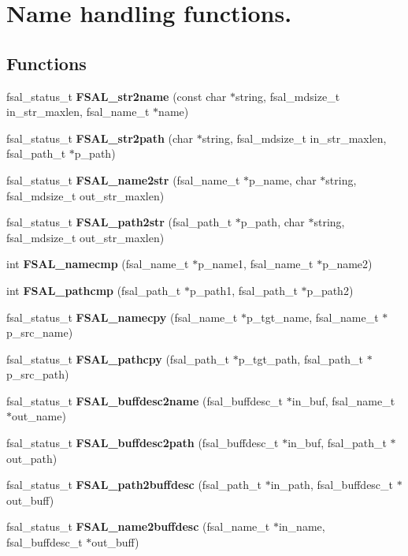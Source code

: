 \section{Name handling functions.}
\label{group__FSALNameFunctions}
\subsection*{Functions}
\begin{CompactItemize}
\item 
fsal\_\-status\_\-t {\bf FSAL\_\-str2name} (const char $\ast$string, fsal\_\-mdsize\_\-t in\_\-str\_\-maxlen, fsal\_\-name\_\-t $\ast$name)
\item 
fsal\_\-status\_\-t {\bf FSAL\_\-str2path} (char $\ast$string, fsal\_\-mdsize\_\-t in\_\-str\_\-maxlen, fsal\_\-path\_\-t $\ast$p\_\-path)
\item 
fsal\_\-status\_\-t {\bf FSAL\_\-name2str} (fsal\_\-name\_\-t $\ast$p\_\-name, char $\ast$string, fsal\_\-mdsize\_\-t out\_\-str\_\-maxlen)
\item 
fsal\_\-status\_\-t {\bf FSAL\_\-path2str} (fsal\_\-path\_\-t $\ast$p\_\-path, char $\ast$string, fsal\_\-mdsize\_\-t out\_\-str\_\-maxlen)
\item 
int {\bf FSAL\_\-namecmp} (fsal\_\-name\_\-t $\ast$p\_\-name1, fsal\_\-name\_\-t $\ast$p\_\-name2)
\item 
int {\bf FSAL\_\-pathcmp} (fsal\_\-path\_\-t $\ast$p\_\-path1, fsal\_\-path\_\-t $\ast$p\_\-path2)
\item 
fsal\_\-status\_\-t {\bf FSAL\_\-namecpy} (fsal\_\-name\_\-t $\ast$p\_\-tgt\_\-name, fsal\_\-name\_\-t $\ast$p\_\-src\_\-name)
\item 
fsal\_\-status\_\-t {\bf FSAL\_\-pathcpy} (fsal\_\-path\_\-t $\ast$p\_\-tgt\_\-path, fsal\_\-path\_\-t $\ast$p\_\-src\_\-path)
\item 
fsal\_\-status\_\-t {\bf FSAL\_\-buffdesc2name} (fsal\_\-buffdesc\_\-t $\ast$in\_\-buf, fsal\_\-name\_\-t $\ast$out\_\-name)
\item 
fsal\_\-status\_\-t {\bf FSAL\_\-buffdesc2path} (fsal\_\-buffdesc\_\-t $\ast$in\_\-buf, fsal\_\-path\_\-t $\ast$out\_\-path)
\item 
fsal\_\-status\_\-t {\bf FSAL\_\-path2buffdesc} (fsal\_\-path\_\-t $\ast$in\_\-path, fsal\_\-buffdesc\_\-t $\ast$out\_\-buff)
\item 
fsal\_\-status\_\-t {\bf FSAL\_\-name2buffdesc} (fsal\_\-name\_\-t $\ast$in\_\-name, fsal\_\-buffdesc\_\-t $\ast$out\_\-buff)
\end{CompactItemize}


